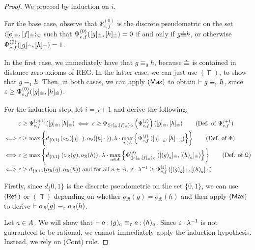 \begin{proof}

We proceed by induction on $i$. 

For the base case, observe that ${\Psi}_{e,f}^{(0)}$ is the discrete pseudometric on the set $\langle [e]_{{\mathrel{\dot\equiv}}},[f]_{{\mathrel{\dot\equiv}}} \rangle_{\mathcal{Q}}$ such that ${\Psi}_{e,f}^{(0)}([g]_{{\mathrel{\dot\equiv}}}, [h]_{{\mathrel{\dot\equiv}}})=0$ if and only if ${{g} {\mathrel{\dot\equiv}} {h}}$, or otherwise ${\Psi}_{e,f}^{(0)}([g]_{{\mathrel{\dot\equiv}}}, [h]_{{\mathrel{\dot\equiv}}})=1$. 

In the first case, we immediately have that $g \equiv_0 h$, because ${\mathrel{\dot\equiv}}$ is contained in distance zero axioms of \textsf{REG}. In the latter case, we can just use $(\Top)$, to show that $g \equiv_1 h $. Then, in both cases, we can apply $(\textsf{Max})$ to obtain $\vdash g \equiv_{\varepsilon} h$, since $\varepsilon \geq {\Psi}_{e,f}^{(0)}([g]_{{\mathrel{\dot\equiv}}}, [h]_{{\mathrel{\dot\equiv}}})$.
	
For the induction step, let $i = j + 1$ and derive the following:
\begin{align*}
    &\e \geq {\Psi}_{e,f}^{(j + 1)}([g]_{\acirel}, [h]_{\acirel})
    \iff \e \geq \Phi_{\gen{[e]_{\acirel},[f]_{\acirel}}{\mathcal{Q}}} \left( {\Psi}_{e,f}^{(j)} \right)\left([g]_{\acirel}, [h]_{\acirel}\right) \tag{Def. of ${\Psi}_{e,f}^{j+1}$}\\
    \iff &\e \geq \max\left\{ d_{\{0,1\}} (o_{\mathcal{Q}}({[g]}_{\acirel}), o_{\mathcal{Q}}([h]_{\acirel})), \lambda \cdot \max_{a \in \alphabet} \left\{ {\Psi}_{e,f}^{(j)}\left({[g]_{\acirel}}_a, {[h]_{\acirel}}_{a}\right) \right\}\right\} \tag{Def. of $\Phi$}\\
    \iff &\e \geq \max\left\{ d_{\{0,1\}} \left(o_{\mathcal{R}}(g), o_{\mathcal{R}}(h)\right), \lambda \cdot \max_{a \in \alphabet} \left\{ \Phi_{\gen{[e]_{\acirel},[f]_{\acirel}}{\mathcal{Q}}}^{(j)}\left({[{(g)}_{a}]_{\acirel}}, {[{(h)}_{a}]_{\acirel}}\right) \right\}\right\} \tag{Def. of $\mathcal{Q}$}\\
    \iff &{\e \geq d_{\{0,1\}} (o_{\mathcal{R}}(g), o_{\mathcal{R}}(h))} \text{ and for all $a \in \alphabet$},~\e \cdot \lambda^{-1} \geq {\Psi}_{e,f}^{(j)}\left({[{(g)}_{a}]_{\acirel}}, {[{(h)}_{a}]_{\acirel}}\right)
\end{align*}

Firstly, since $d_\{0,1\}$ is the discrete pseudometric on the set $\{0,1\}$, we can use $(\textsf{Refl})$ or $(\Top)$ depending on whether $o_{\mathcal{R}}(g) = o_{\mathcal{R}}(h)$ and then apply $(\textsf{Max})$ to derive $\vdash o_{\mathcal{R}}(g) \equiv_\varepsilon o_{\mathcal{R}}(h)$. 

Let $a \in {A}$. We will show that $\vdash a\mathbin{;} (g)_a \equiv_{\varepsilon} a \mathbin{;} (h)_a $. Since $\varepsilon \cdot \lambda^{-1}$ is not guaranteed to be rational, we cannot immediately apply the induction hypothesis. Instead, we rely on \textsf{(Cont)} rule. 


\end{proof}
